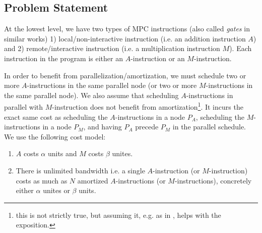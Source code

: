 \subsection{Problem Statement}
\label{sec:problem}


At the lowest level, we have two types of MPC instructions (also called \emph{gates} in similar works) 1) local/non-interactive instruction (i.e. an addition instruction $A$) and 2) remote/interactive instruction (i.e. a multiplication instruction $M$). Each instruction in the program is either an $A$-instruction or an $M$-instruction.

In order to benefit from parallelization/amortization, we must schedule two or more $A$-instructions in the same parallel node (or two or more $M$-instructions in the same parallel node). We also assume that scheduling $A$-instructions in parallel with $M$-instruction does not benefit from amortization\footnote{this is not strictly true, but assuming it, e.g. as in \cite{Ishaq2019, Demmler2015ABYA, Mohassel2018}, helps with the exposition.}. It incurs the exact same cost as scheduling the $A$-instructions in a node $P_A$, scheduling the $M$-instructions in a node $P_M$, and having $P_A$ precede $P_M$ in the parallel schedule. We use the following cost model:

\begin{enumerate}
    \item $A$ costs $\alpha$ units and $M$ costs $\beta$ unites.
    \item There is unlimited bandwidth i.e. a single $A$-instruction (or $M$-instruction) costs as much as $N$ amortized $A$-instructions (or $M$-instructions), concretely either $\alpha$ unites or $\beta$ units.
\end{enumerate}




